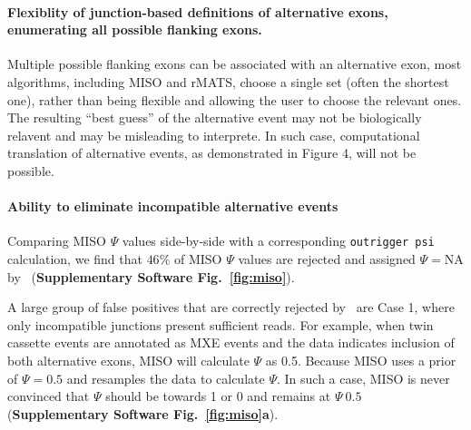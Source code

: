 \paragraph{Flexiblity of junction-based definitions of alternative exons, enumerating all possible flanking exons.} Multiple possible flanking exons can be associated with an alternative exon, most algorithms, including MISO and rMATS\cite{Shen:2014gs}, choose a single set (often the shortest one), rather than being flexible and allowing the user to choose the relevant ones. The resulting ``best guess'' of the alternative event may not be biologically relavent and may be misleading to interprete. In such case, computational translation of alternative events, as demonstrated in Figure 4, will not be possible. 

\paragraph{Ability to eliminate incompatible alternative events} Comparing MISO $\Psi$ values side-by-side with a corresponding \texttt{outrigger psi} calculation, we find that $46\%$ of MISO $\Psi$ values are rejected and assigned $\Psi = \text{NA}$ by \outrigger\, (\textbf{Supplementary Software Fig.~\ref{fig:miso}}). 

A large group of false positives that are correctly rejected by \outrigger\, are Case 1, where only incompatible junctions present sufficient reads. For example, when twin cassette events are annotated as MXE events and the data indicates inclusion of both alternative exons, MISO will calculate $\Psi$ as 0.5. Because MISO uses a prior of $\Psi=0.5$ and resamples the data to calculate $\Psi$. In such a case, MISO is never convinced that $\Psi$ should be towards 1 or 0 and remains at $\Psi~0.5$ (\textbf{Supplementary Software Fig.~\ref{fig:miso}a}). %

